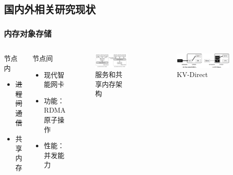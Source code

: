 \subsection*{国内外相关研究现状}
\begin{frame}
	\frametitle{内存对象存储}

	\vspace*{-1em}
	\begin{columns}[t]
		\begin{block}{节点内}
			\begin{itemize}
				\item \sout{进程间通信}
				\item 共享内存
			\end{itemize}
		\end{block}
		\begin{block}{节点间}
			\begin{itemize}
				\item 现代智能网卡
				\item 功能：RDMA原子操作
				\item 性能：并发能力
			\end{itemize}
		\end{block}
		\begin{figure}
			\centering
			\includegraphics[width=\textwidth]{image/presentation/arch.png}
			\caption{服务和共享内存架构\protect\footnotemark[1]}
		\end{figure}
		\vspace*{-1.5em}
		\begin{figure}
			\centering
			\includegraphics[width=\textwidth]{image/presentation/kvdirect.png}
			\caption{KV-Direct\protect\footnotemark[2]}
		\end{figure}
	\end{columns}

\end{frame}

